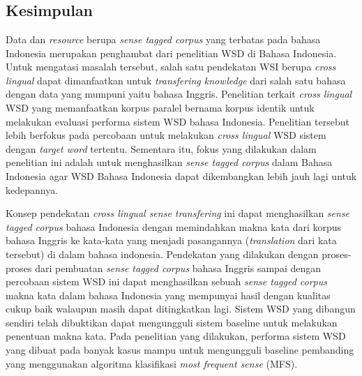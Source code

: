 \chapter{\babEnam}

\section{Kesimpulan}

Data dan \textit{resource} berupa \textit{sense tagged corpus} yang terbatas pada bahasa Indonesia merupakan penghambat dari penelitian WSD di Bahasa Indonesia. Untuk mengatasi masalah tersebut, salah satu pendekatan WSI berupa \textit{cross lingual} dapat dimanfaatkan untuk \textit{transfering knowledge} dari salah satu bahasa dengan data yang mumpuni yaitu bahasa Inggris. Penelitian \citep{septiantri2013wsd} terkait \textit{cross lingual} WSD yang memanfaatkan korpus paralel bernama korpus identik untuk melakukan evaluasi performa sistem WSD bahasa Indonesia. Penelitian tersebut lebih berfokus pada percobaan untuk melakukan \textit{cross lingual} WSD sistem dengan \textit{target word} tertentu. Sementara itu, fokus yang dilakukan dalam penelitian ini adalah untuk menghasilkan \textit{sense tagged corpus} dalam Bahasa Indonesia agar WSD Bahasa Indonesia dapat dikembangkan lebih jauh lagi untuk kedepannya. 

Konsep pendekatan \textit{cross lingual sense transfering} ini dapat menghasilkan \textit{sense tagged corpus} bahasa Indonesia dengan memindahkan makna kata dari korpus bahasa Inggris ke kata-kata yang menjadi pasangannya (\textit{translation} dari kata tersebut) di dalam bahasa indonesia. Pendekatan yang dilakukan dengan proses-proses dari pembuatan \textit{sense tagged corpus} bahasa Inggris sampai dengan percobaan sistem WSD ini dapat menghasilkan sebuah \textit{sense tagged corpus} makna kata dalam bahasa Indonesia yang mempunyai hasil dengan kualitas cukup baik walaupun masih dapat ditingkatkan lagi. Sistem WSD yang dibangun sendiri telah dibuktikan dapat mengungguli sistem baseline untuk melakukan penentuan makna kata. Pada penelitian yang dilakukan, performa sistem WSD yang dibuat pada banyak kasus mampu untuk mengungguli baseline pembanding yang menggunakan algoritma klasifikasi \textit{most frequent sense} (MFS).
